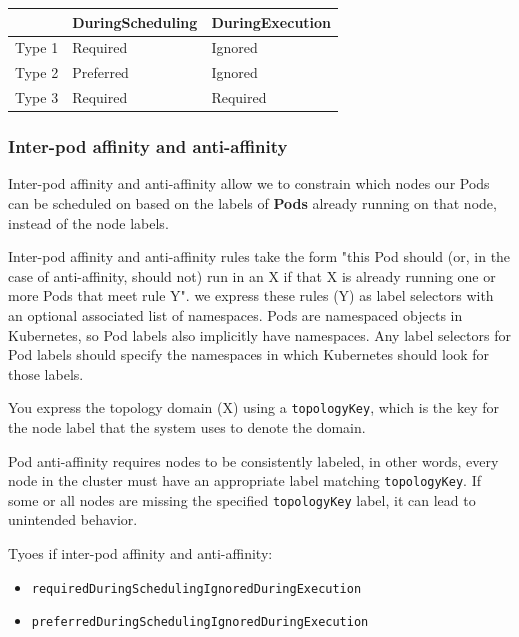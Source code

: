 \documentclass{article}
\newenvironment{blocktemplateII}[1]{%
    \tcolorbox[beamer,%
    noparskip,breakable,
    colframe=Green,%
    colbacklower=LimeGreen!75!LightGreen,%
    title=#1]}%
    {\endtcolorbox}
\begin{document}
\begin{table}[H]
\begin{tabular}{| m{3cm} | m{4cm} | m{4cm} |}
\hline
& \textbf{DuringScheduling} & \textbf{DuringExecution} \\ \hline
Type 1 & Required & Ignored \\ \hline
Type 2 & Preferred & Ignored \\ \hline
Type 3 & Required & Required \\ \hline
\end{tabular}
\end{table}

\subsubsection{Inter-pod affinity and anti-affinity}
Inter-pod affinity and anti-affinity allow we to constrain which nodes our Pods can be scheduled on based on the labels of \textbf{Pods} already running on that node, instead of the node labels.

Inter-pod affinity and anti-affinity rules take the form "this Pod should (or, in the case of anti-affinity, should not) run in an X if that X is already running one or more Pods that meet rule Y". we express these rules (Y) as label selectors with an optional associated list of namespaces. Pods are namespaced objects in Kubernetes, so Pod labels also implicitly have namespaces. Any label selectors for Pod labels should specify the namespaces in which Kubernetes should look for those labels.

You express the topology domain (X) using a \verb|topologyKey|, which is the key for the node label that the system uses to denote the domain.

\begin{blocktemplateII}{NOTE}
Pod anti-affinity requires nodes to be consistently labeled, in other words, every node in the cluster must have an appropriate label matching \verb|topologyKey|. If some or all nodes are missing the specified \verb|topologyKey| label, it can lead to unintended behavior.
\end{blocktemplateII}

Tyoes if inter-pod affinity and anti-affinity:
\begin{itemize}
    \item \verb|requiredDuringSchedulingIgnoredDuringExecution|
    \item \verb|preferredDuringSchedulingIgnoredDuringExecution|
\end{itemize}
\end{document}

